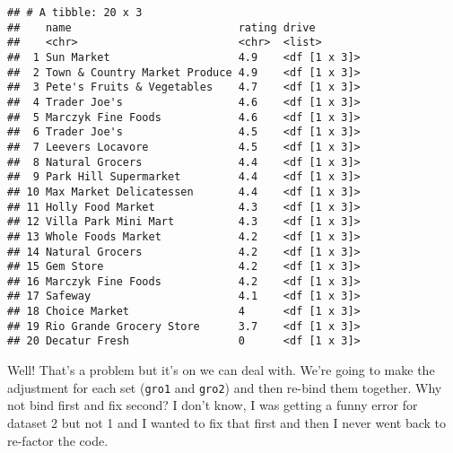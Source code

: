 \documentclass[]{tufte-handout}
\begin{document}
\begin{verbatim}
## # A tibble: 20 x 3
##    name                          rating drive       
##    <chr>                         <chr>  <list>      
##  1 Sun Market                    4.9    <df [1 x 3]>
##  2 Town & Country Market Produce 4.9    <df [1 x 3]>
##  3 Pete's Fruits & Vegetables    4.7    <df [1 x 3]>
##  4 Trader Joe's                  4.6    <df [1 x 3]>
##  5 Marczyk Fine Foods            4.6    <df [1 x 3]>
##  6 Trader Joe's                  4.5    <df [1 x 3]>
##  7 Leevers Locavore              4.5    <df [1 x 3]>
##  8 Natural Grocers               4.4    <df [1 x 3]>
##  9 Park Hill Supermarket         4.4    <df [1 x 3]>
## 10 Max Market Delicatessen       4.4    <df [1 x 3]>
## 11 Holly Food Market             4.3    <df [1 x 3]>
## 12 Villa Park Mini Mart          4.3    <df [1 x 3]>
## 13 Whole Foods Market            4.2    <df [1 x 3]>
## 14 Natural Grocers               4.2    <df [1 x 3]>
## 15 Gem Store                     4.2    <df [1 x 3]>
## 16 Marczyk Fine Foods            4.2    <df [1 x 3]>
## 17 Safeway                       4.1    <df [1 x 3]>
## 18 Choice Market                 4      <df [1 x 3]>
## 19 Rio Grande Grocery Store      3.7    <df [1 x 3]>
## 20 Decatur Fresh                 0      <df [1 x 3]>
\end{verbatim}

Well! That's a problem but it's on we can deal with. We're going to make
the adjustment for each set (\texttt{gro1} and \texttt{gro2}) and then
re-bind them together. Why not bind first and fix second? I don't know,
I was getting a funny error for dataset 2 but not 1 and I wanted to fix
that first and then I never went back to re-factor the code.
\end{document}
